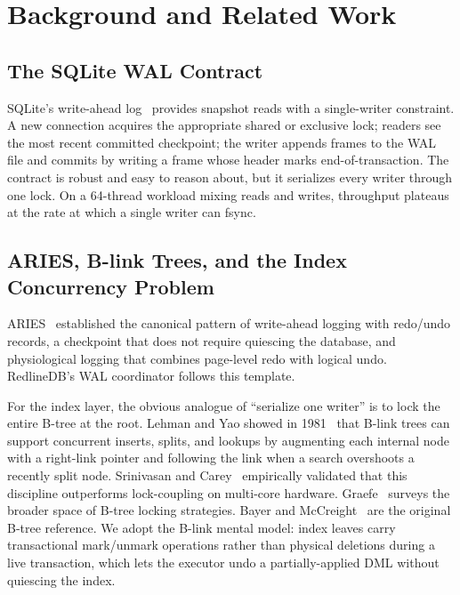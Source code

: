 \section{Background and Related Work}\label{sec:background}

\subsection{The SQLite WAL Contract}
SQLite's write-ahead log~\cite{sqlite_wal} provides snapshot reads with
a single-writer constraint. A new connection acquires the appropriate
shared or exclusive lock; readers see the most recent committed
checkpoint; the writer appends frames to the WAL file and commits by
writing a frame whose header marks end-of-transaction. The contract is
robust and easy to reason about, but it serializes every writer through
one lock. On a 64-thread workload mixing reads and writes, throughput
plateaus at the rate at which a single writer can fsync.

\subsection{ARIES, B-link Trees, and the Index Concurrency Problem}
ARIES~\cite{mohan1992aries} established the canonical pattern of
write-ahead logging with redo/undo records, a checkpoint that does not
require quiescing the database, and physiological logging that combines
page-level redo with logical undo. RedlineDB's WAL coordinator follows
this template.

For the index layer, the obvious analogue of ``serialize one writer''
is to lock the entire B-tree at the root. Lehman and Yao showed in
1981~\cite{lehman1981blink} that B-link trees can support concurrent
inserts, splits, and lookups by augmenting each internal node with a
right-link pointer and following the link when a search overshoots a
recently split node. Srinivasan and Carey~\cite{srinivasan1991bplus}
empirically validated that this discipline outperforms lock-coupling
on multi-core hardware. Graefe~\cite{graefe2010btree} surveys the
broader space of B-tree locking strategies. Bayer and
McCreight~\cite{bayer1972btree} are the original B-tree reference. We
adopt the B-link mental model: index leaves carry transactional
mark/unmark operations rather than physical deletions during a live
transaction, which lets the executor undo a partially-applied DML
without quiescing the index.

